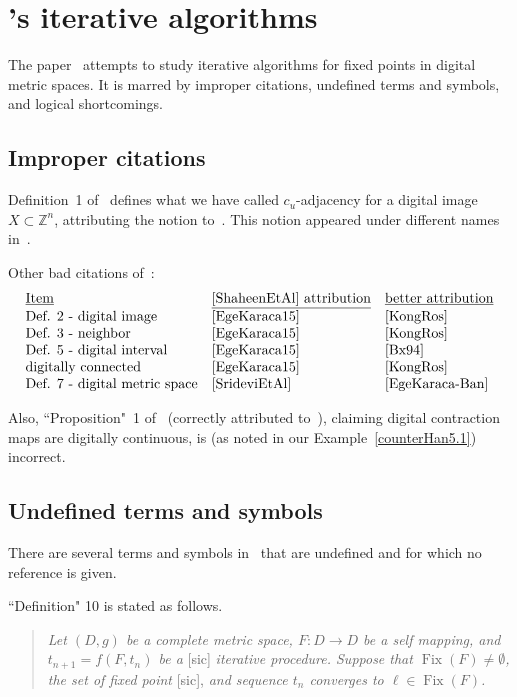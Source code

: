 \documentclass{article}
\numberwithin{thm}{section}
\DeclareMathOperator{\Fix}{Fix}
\def\Z{{\mathbb Z}}
\begin{document}
\section{\cite{ShaheenEtAl}'s 
iterative algorithms}
The paper~\cite{ShaheenEtAl}
attempts to study iterative
algorithms for fixed points
in digital metric spaces. It is
marred by improper citations,
undefined terms and symbols,
and logical shortcomings.

\subsection{Improper citations}
Definition~1 of~\cite{ShaheenEtAl}
defines what we have called
$c_u$-adjacency for a digital
image $X \subset \Z^n$, attributing the notion 
to~\cite{EgeKaraca15}.
This notion appeared under
different names in~\cite{HanNon,BxHtpyProps}.

Other bad citations of~\cite{ShaheenEtAl}:
\[
\begin{array}{lll}
\mbox{\underline{Item}} &
\mbox{\underline{\cite{ShaheenEtAl} attribution}} & \mbox{\underline{better attribution}} \\
\mbox{Def. 2 - digital image}
& \mbox{\cite{EgeKaraca15}} &
\mbox{\cite{KongRos}} \\
\mbox{Def. 3 - neighbor}
& \mbox{\cite{EgeKaraca15}} &
\mbox{\cite{KongRos}} \\
\mbox{Def. 5 - digital interval} &
\mbox{\cite{EgeKaraca15}} &
\mbox{\cite{Bx94}} \\
\mbox{digitally connected} &
\mbox{\cite{EgeKaraca15}} &
\mbox{\cite{KongRos}} \\
\mbox{Def. 7 - digital metric space} &\mbox{\cite{SrideviEtAl}} &
\mbox{\cite{EgeKaraca-Ban}} 
\end{array}
\]

Also, ``Proposition"~1 
of~\cite{ShaheenEtAl}
(correctly attributed
to~\cite{EgeKaraca-Ban}), claiming digital 
contraction maps are digitally continuous, 
is (as noted in our Example~\ref{counterHan5.1})
incorrect.

\subsection{Undefined terms and
symbols}
There are several terms and
symbols in~\cite{ShaheenEtAl}
that are undefined and for
which no reference is given.

``Definition" 10 is stated as
follows.
\begin{quote}
    {\em Let $(D,g)$ be a complete metric space, $F: D \to D$
    be a self mapping, and
    $t_{n+1} = f(F,t_n)$
    be a} [sic] {\em iterative procedure. Suppose that
    $\Fix(F) \neq \emptyset$,
    the set of fixed point} 
    [sic], {\em and
sequence $t_n$ converges to
$\ell \in \Fix(F)$.}
\end{quote}
\end{document}
